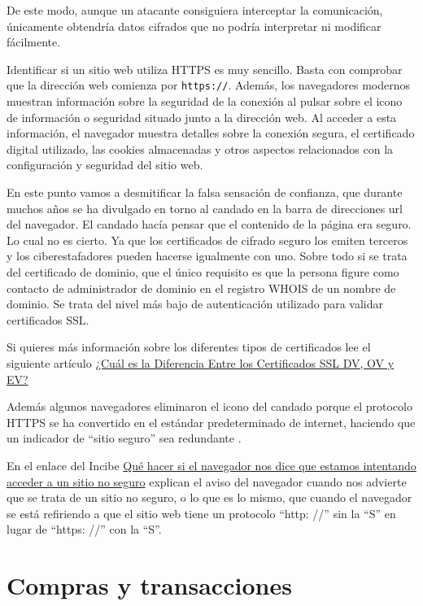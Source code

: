 \documentclass[
  spanish,
  a4paper,
  openany]{book}
\begin{document}
De este modo, aunque un atacante consiguiera interceptar la comunicación, únicamente obtendría datos cifrados que no podría interpretar ni modificar fácilmente.

Identificar si un sitio web utiliza HTTPS es muy sencillo. Basta con comprobar que la dirección web comienza por \texttt{https://}. Además, los navegadores modernos muestran información sobre la seguridad de la conexión al pulsar sobre el icono de información o seguridad situado junto a la dirección web. Al acceder a esta información, el navegador muestra detalles sobre la conexión segura, el certificado digital utilizado, las cookies almacenadas y otros aspectos relacionados con la configuración y seguridad del sitio web.

En este punto vamos a desmitificar la falsa sensación de confianza, que durante muchos años se ha divulgado en torno al candado en la barra de direcciones url del navegador. El candado hacía pensar que el contenido de la página era seguro. Lo cual no es cierto. Ya que los certificados de cifrado seguro los emiten terceros y los ciberestafadores pueden hacerse igualmente con uno. Sobre todo si se trata del certificado de dominio, que el único requisito es que la persona figure como contacto de administrador de dominio en el registro WHOIS de un nombre de dominio. Se trata del nivel más bajo de autenticación utilizado para validar certificados SSL.

Si quieres más información sobre los diferentes tipos de certificados lee el siguiente artículo \href{https://www.digicert.com/es/difference-between-dv-ov-and-ev-ssl-certificates}{¿Cuál es la Diferencia Entre los Certificados SSL DV, OV y EV?}

Además algunos navegadores eliminaron el icono del candado porque el protocolo HTTPS se ha convertido en el estándar predeterminado de internet, haciendo que un indicador de ``sitio seguro'' sea redundante \citep{CONFIDENCIAL-candado}.

En el enlace del Incibe \href{https://www.incibe.es/ciudadania/blog/que-hacer-si-el-navegador-nos-dice-que-estamos-intentando-acceder-un-sitio-no}{Qué hacer si el navegador nos dice que estamos intentando acceder a un sitio no seguro} explican el aviso del navegador cuando nos advierte que se trata de un sitio no seguro, o lo que es lo mismo, que cuando el navegador se está refiriendo a que el sitio web tiene un protocolo ``http: //'' sin la ``S'' en lugar de ``https: //'' con la ``S''.

\section{Compras y transacciones}\label{compras-y-transacciones}
\end{document}
